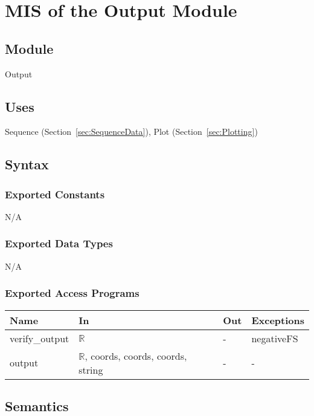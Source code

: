 \documentclass[12pt, titlepage]{article}
\begin{document}
\section{MIS of the Output Module} \label{sec:OutputMod}

\subsection{Module}
Output

\subsection{Uses}

Sequence (Section~\ref{sec:SequenceData}), Plot (Section~\ref{sec:Plotting})

\subsection{Syntax}

\subsubsection{Exported Constants}
N/A

\subsubsection{Exported Data Types}
N/A

\subsubsection{Exported Access Programs}

\begin{center}
	\renewcommand*{\arraystretch}{1.5}
	\begin{tabular} {p{}  p{}  p{} 
			p{} } \hline 
		\textbf{Name} & \textbf{In} & \textbf{Out} & \textbf{Exceptions} \\ 
		\hline
		
		verify\_output & $\mathbb{R}$ & - & negativeFS \\
		output & $\mathbb{R}$, coords, coords, coords, string & - & - \\ \hline
	\end{tabular}
\end{center}

\subsection{Semantics}
\end{document}
